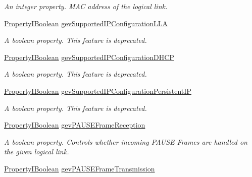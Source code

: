 \begin{DoxyCompactItemize}
\begin{DoxyCompactList}\small\item\em An integer property. M\+A\+C address of the logical link. \end{DoxyCompactList}\item 
\hyperlink{group___common_interface_ga44f9437e24b21b6c93da9039ec6786aa}{Property\+I\+Boolean} \hyperlink{classmv_i_m_p_a_c_t_1_1acquire_1_1_gen_i_cam_1_1_transport_layer_control_af7c04818203a537b79bf3e4cdcc6b7ce}{gev\+Supported\+I\+P\+Configuration\+L\+L\+A}
\begin{DoxyCompactList}\small\item\em A boolean property. This feature is deprecated. \end{DoxyCompactList}\item 
\hyperlink{group___common_interface_ga44f9437e24b21b6c93da9039ec6786aa}{Property\+I\+Boolean} \hyperlink{classmv_i_m_p_a_c_t_1_1acquire_1_1_gen_i_cam_1_1_transport_layer_control_a600a9dd1838db2516178dc639475100c}{gev\+Supported\+I\+P\+Configuration\+D\+H\+C\+P}
\begin{DoxyCompactList}\small\item\em A boolean property. This feature is deprecated. \end{DoxyCompactList}\item 
\hyperlink{group___common_interface_ga44f9437e24b21b6c93da9039ec6786aa}{Property\+I\+Boolean} \hyperlink{classmv_i_m_p_a_c_t_1_1acquire_1_1_gen_i_cam_1_1_transport_layer_control_a0f269aa176f62981597215cdceaeb7d1}{gev\+Supported\+I\+P\+Configuration\+Persistent\+I\+P}
\begin{DoxyCompactList}\small\item\em A boolean property. This feature is deprecated. \end{DoxyCompactList}\item 
\hyperlink{group___common_interface_ga44f9437e24b21b6c93da9039ec6786aa}{Property\+I\+Boolean} \hyperlink{classmv_i_m_p_a_c_t_1_1acquire_1_1_gen_i_cam_1_1_transport_layer_control_ac76f66b80f142449a226185307e344fd}{gev\+P\+A\+U\+S\+E\+Frame\+Reception}
\begin{DoxyCompactList}\small\item\em A boolean property. Controls whether incoming P\+A\+U\+S\+E Frames are handled on the given logical link. \end{DoxyCompactList}\item 
\hyperlink{group___common_interface_ga44f9437e24b21b6c93da9039ec6786aa}{Property\+I\+Boolean} \hyperlink{classmv_i_m_p_a_c_t_1_1acquire_1_1_gen_i_cam_1_1_transport_layer_control_a08688eb9f572aa6a47470b2371a45e43}{gev\+P\+A\+U\+S\+E\+Frame\+Transmission}

\end{DoxyCompactItemize}
